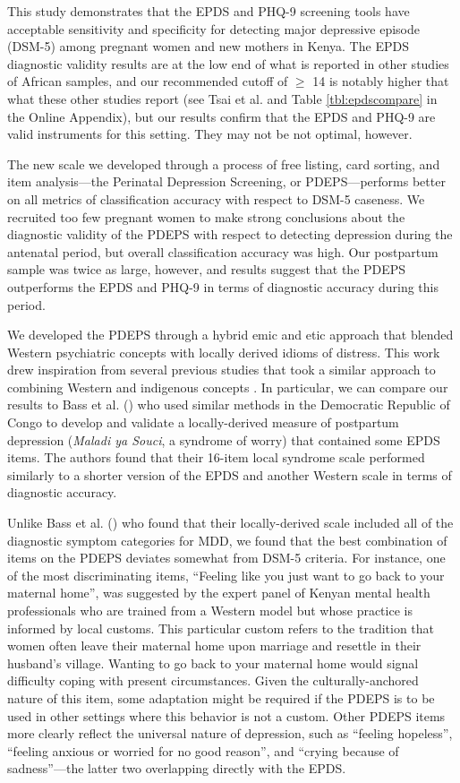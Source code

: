 \documentclass[man,natbib,longtable]{apa6}\usepackage[]{graphicx}\usepackage[]{color}
\begin{document}
This study demonstrates that the EPDS and PHQ-9 screening tools have acceptable sensitivity and specificity for detecting major depressive episode (DSM-5) among pregnant women and new mothers in Kenya. The EPDS diagnostic validity results are at the low end of what is reported in other studies of African samples, and our recommended cutoff of $\geq$ 14 is notably higher that what these other studies report (see Tsai et al. \citeyear{Tsai:2013} and Table \ref{tbl:epdscompare} in the Online Appendix), but our results confirm that the EPDS and PHQ-9 are valid instruments for this setting. They may not be not optimal, however.

The new scale we developed through a process of free listing, card sorting, and item analysis---the Perinatal Depression Screening, or PDEPS---performs better on all metrics of classification accuracy with respect to DSM-5 caseness. We recruited too few pregnant women to make strong conclusions about the diagnostic validity of the PDEPS with respect to detecting depression during the antenatal period, but overall classification accuracy was high. Our postpartum sample was twice as large, however, and results suggest that the PDEPS outperforms the EPDS and PHQ-9 in terms of diagnostic accuracy during this period.

We developed the PDEPS through a hybrid emic and etic approach that blended Western psychiatric concepts with locally derived idioms of distress. This work drew inspiration from several previous studies that took a similar approach to combining Western and indigenous concepts \citep[e.g.,][]{Bass:2008,Kaaya:2008,Nhiwatiwa:1998,Patel:1997}. In particular, we can compare our results to Bass et al. (\citeyear{Bass:2008}) who used similar methods in the Democratic Republic of Congo to develop and validate a locally-derived measure of postpartum depression (\textit{Maladi ya Souci}, a syndrome of worry) that contained some EPDS items. The authors found that their 16-item local syndrome scale performed similarly to a shorter version of the EPDS and another Western scale in terms of diagnostic accuracy.

Unlike Bass et al. (\citeyear{Bass:2008}) who found that their locally-derived scale included all of the diagnostic symptom categories for MDD, we found that the best combination of items on the PDEPS deviates somewhat from DSM-5 criteria. For instance, one of the most discriminating items, ``Feeling like you just want to go back to your maternal home'', was suggested by the expert panel of Kenyan mental health professionals who are trained from a Western model but whose practice is informed by local customs. This particular custom refers to the tradition that women often leave their maternal home upon marriage and resettle in their husband's village. Wanting to go back to your maternal home would signal difficulty coping with present circumstances. Given the culturally-anchored nature of this item, some adaptation might be required if the PDEPS is to be used in other settings where this behavior is not a custom. Other PDEPS items more clearly reflect the universal nature of depression, such as ``feeling hopeless'', ``feeling anxious or worried for no good reason'', and ``crying because of sadness''---the latter two overlapping directly with the EPDS.
\end{document}
